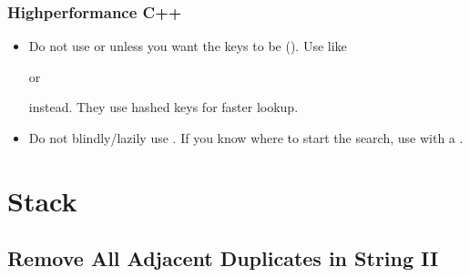 \documentclass[letterpaper,12pt,english]{book}
\begin{document}
\subsection{High\sphinxhyphen{}performance C++}
\label{\detokenize{String/08_STR_929_Unique_Email_Addresses:high-performance-c}}\begin{itemize}
\item {} 
\sphinxAtStartPar
Do not use  or  unless you want the keys to be  (). Use  like %
\begin{footnote}[41]\sphinxAtStartFootnote
{}
%
\end{footnote} or %
\begin{footnote}[42]\sphinxAtStartFootnote
{}
%
\end{footnote} instead. They use hashed keys for faster lookup.

\item {} 
\sphinxAtStartPar
Do not blindly/lazily use . If you know where to start the search, use  with a  .

\end{itemize}

\sphinxstepscope


\chapter{Stack}
\label{\detokenize{Stack/index:stack}}\label{\detokenize{Stack/index::doc}}
\sphinxstepscope


\section{Remove All Adjacent Duplicates in String II}
\label{\detokenize{Stack/1209_Remove_All_Adjacent_Duplicates_in_String_II:remove-all-adjacent-duplicates-in-string-ii}}\label{\detokenize{Stack/1209_Remove_All_Adjacent_Duplicates_in_String_II::doc}}
\end{document}

